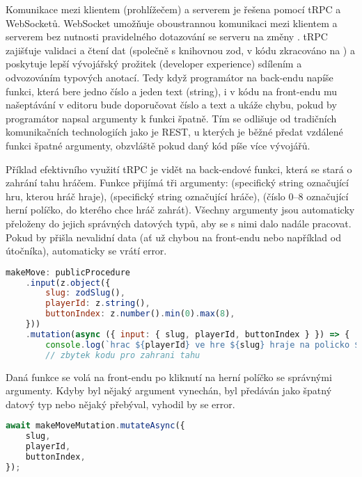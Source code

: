 Komunikace mezi klientem (prohlížečem) a serverem je řešena pomocí tRPC a
WebSocketů. WebSocket umožňuje oboustrannou komunikaci mezi klientem a serverem
bez nutnosti pravidelného dotazování se serveru na změny \cite{mdn-ws}. tRPC
zajišťuje validaci a čtení dat (společně s knihovnou zod, v kódu zkracováno na
) a poskytuje lepší vývojářský prožitek (developer experience) sdílením a
odvozováním typových anotací. Tedy když programátor na back-endu napíše funkci,
která bere jedno číslo a jeden text (string), i v kódu na front-endu mu
našeptávání v editoru bude doporučovat číslo a text a ukáže chybu, pokud by
programátor napsal argumenty k funkci špatně. Tím se odlišuje od tradičních
komunikačních technologiích jako je REST, u kterých je běžné předat vzdálené
funkci špatné argumenty, obzvláště pokud daný kód píše více vývojářů.

Příklad efektivního využití tRPC je vidět na back-endové funkci, která se stará
o zahrání tahu hráčem. Funkce přijímá tři argumenty:  (specifický
string označující hru, kterou hráč hraje),  (specifický string
označující hráče),  (číslo 0--8 označující herní políčko, do
kterého chce hráč zahrát). Všechny argumenty jsou automaticky přeloženy do
jejich správných datových typů, aby se s nimi dalo nadále pracovat. Pokud by
přišla nevalidní data (ať už chybou na front-endu nebo například od útočníka),
automaticky se vrátí error.

\begin{lstlisting}[language=JavaScript,caption={Funkce pro zahrání tahu},label={fig:be-make-move}]
makeMove: publicProcedure
    .input(z.object({
        slug: zodSlug(),
        playerId: z.string(),
        buttonIndex: z.number().min(0).max(8),
    }))
    .mutation(async ({ input: { slug, playerId, buttonIndex } }) => {
        console.log(`hrac ${playerId} ve hre ${slug} hraje na policko ${buttonIndex}`);
        // zbytek kodu pro zahrani tahu
\end{lstlisting}

Daná funkce se volá na front-endu po kliknutí na herní políčko se správnými
argumenty. Kdyby byl nějaký argument vynechán, byl předáván jako špatný datový
typ nebo nějaký přebýval, vyhodil by se error.

\begin{lstlisting}[language=JavaScript,caption={Volání funkce pro zahrání tahu},label={fig:fe-make-move}]
await makeMoveMutation.mutateAsync({
    slug,
    playerId,
    buttonIndex,
});
\end{lstlisting}

